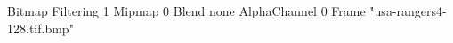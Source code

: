 {Bitmap
	{Filtering 1}
	{Mipmap 0}
	{Blend none}
	{AlphaChannel 0}
	{Frame "usa-rangers4-128.tif.bmp"}
}

